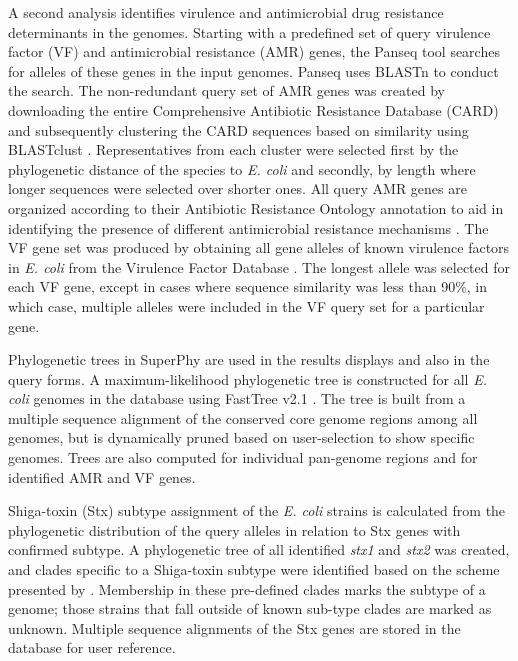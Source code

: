 \documentclass[a4paper,twoside]{article}
\begin{document}
A second analysis identifies virulence and antimicrobial drug resistance determinants in the genomes. Starting with a predefined set of query virulence factor (VF) and antimicrobial resistance (AMR) genes, the Panseq tool searches for alleles of these genes in the input genomes. Panseq uses BLASTn to conduct the search. The non-redundant query set of AMR genes was created by downloading the entire Comprehensive Antibiotic Resistance Database (CARD) \cite{mcarthur2012card} and subsequently clustering the CARD sequences based on similarity using BLASTclust \cite{altschul_gapped_1997}. Representatives from each cluster were selected first by the phylogenetic distance of the species to \textit{E. coli} and secondly, by length where longer sequences were selected over shorter ones. All query AMR genes are organized according to their Antibiotic Resistance Ontology annotation to aid in identifying the presence of different antimicrobial resistance mechanisms \cite{antezana_biological_2009}. The VF gene set was produced by obtaining all gene alleles of known virulence factors in \textit{E. coli} from the Virulence Factor Database \cite{chen2012vfdb,chen2005vfdb}.  The longest allele was selected for each VF gene, except in cases where sequence similarity was less than 90\%, in which case, multiple alleles were included in the VF query set for a particular gene.

Phylogenetic trees in SuperPhy are used in the results displays and also in the query forms. A maximum-likelihood phylogenetic tree is constructed for all \textit{E. coli} genomes in the database using FastTree v2.1 \cite{price_fasttree_2010}. The tree is built from a multiple sequence alignment of the conserved core genome regions among all genomes, but is dynamically pruned based on user-selection to show specific genomes. Trees are also computed for individual pan-genome regions and for identified AMR and VF genes.

Shiga-toxin (Stx) subtype assignment of the \textit{E. coli} strains is calculated from the phylogenetic distribution of the query alleles in relation to Stx genes with confirmed subtype. A phylogenetic tree of all identified \textit{stx1} and \textit{stx2} was created, and clades specific to a Shiga-toxin subtype were identified based on the scheme presented by \cite{scheutz_multicenter_2012}. Membership in these pre-defined clades marks the subtype of a genome; those strains that fall outside of known sub-type clades are marked as unknown. Multiple sequence alignments of the Stx genes are stored in the database for user reference.
\end{document}
